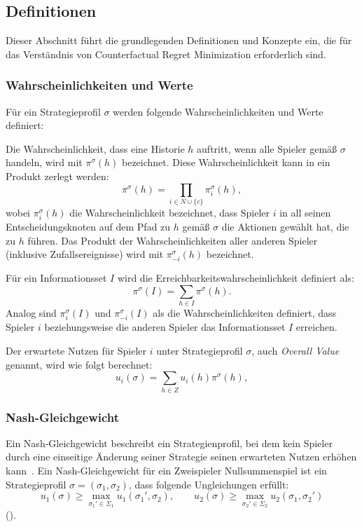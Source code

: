\subsection{Definitionen}


Dieser Abschnitt führt die grundlegenden Definitionen und Konzepte ein, die für das Verständnis von Counterfactual Regret Minimization erforderlich sind.

\subsubsection{Wahrscheinlichkeiten und Werte}

Für ein Strategieprofil $\sigma$ werden folgende Wahrscheinlichkeiten und Werte definiert:

Die Wahrscheinlichkeit, dass eine Historie $h$ auftritt, wenn alle Spieler gemäß $\sigma$ handeln, wird mit $\pi^\sigma(h)$ bezeichnet.
Diese Wahrscheinlichkeit kann in ein Produkt zerlegt werden:
\begin{equation}
\pi^\sigma(h) = \prod_{i \in N \cup \{c\}} \pi_i^\sigma(h),
\end{equation}
wobei $\pi_i^\sigma(h)$ die Wahrscheinlichkeit bezeichnet, dass Spieler $i$ in all seinen Entscheidungsknoten auf dem Pfad zu $h$ gemäß $\sigma$ die Aktionen gewählt hat, die zu $h$ führen.
Das Produkt der Wahrscheinlichkeiten aller anderen Spieler (inklusive Zufallsereignisse) wird mit $\pi_{-i}^\sigma(h)$ bezeichnet.

Für ein Informationsset $I$ wird die Erreichbarkeitswahrscheinlichkeit definiert als:
\begin{equation}
\pi^\sigma(I) = \sum_{h \in I} \pi^\sigma(h).
\end{equation}
Analog sind $\pi_i^\sigma(I)$ und $\pi_{-i}^\sigma(I)$ als die Wahrscheinlichkeiten definiert, dass Spieler $i$ beziehungsweise die anderen Spieler das Informationsset $I$ erreichen.

Der erwartete Nutzen für Spieler $i$ unter Strategieprofil $\sigma$, auch \emph{Overall Value} genannt, wird wie folgt berechnet:
\begin{equation}
u_i(\sigma) = \sum_{h \in Z} u_i(h) \pi^\sigma(h),
\end{equation}


\subsubsection{Nash-Gleichgewicht}
Ein Nash‑Gleichgewicht beschreibt ein Strategienprofil, bei dem kein Spieler durch eine einseitige Änderung seiner Strategie seinen erwarteten Nutzen erhöhen kann~\cite[Ch.~11, Sec.~11.5]{osborne1994course}.
Ein Nash-Gleichgewicht für ein Zweispieler Nullsummenspiel ist ein Strategieprofil $\sigma = (\sigma_1, \sigma_2)$, dass folgende Ungleichungen erfüllt:
\begin{equation}
u_1(\sigma) \ge \max_{\sigma_1' \in \Sigma_1} u_1(\sigma_1', \sigma_2),
\qquad
u_2(\sigma) \ge \max_{\sigma_2' \in \Sigma_2} u_2(\sigma_1, \sigma_2')
\end{equation}
(\cite[Eq.~1]{zinkevich2007regret}).

